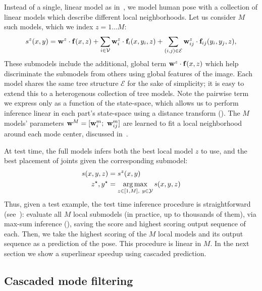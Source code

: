 Instead of a single, linear model as in~, we model human pose 
with a collection of linear models which describe different local 
neighborhoods.  Let us consider $M$ such models, which we index $z = 1 \ldots 
M$:
\begin{align}
s^z(x,y) = \mathbf{w}^z \cdot \mathbf{f}(x,z) +  \sum_{i \in \mathcal{V}} \mathbf{w}^z_i \cdot \mathbf{f}_i(x,y_i,z) + 
\sum_{(i,j) \in \mathcal{E}} \mathbf{w}^z_{ij} \cdot \mathbf{f}_{ij}(y_i,y_j,z),
\end{align}
These submodels include the additional, global term $\mathbf{w}^z \cdot \mathbf{f}(x,z)$ which 
help discriminate the submodels from others using global features of the image.  
Each model shares the same tree structure $\mathcal{E}$ for the sake of 
simplicity; it is easy to extend this to a heterogenous collection of tree 
models.  Note the pairwise term we express only as a function of the 
state-space, which allows us to perform inference linear in each part's 
state-space using a distance transform ().  The $M$ models' 
parameters $\mathbf{w}^M = [\mathbf{w}^m_i;~\mathbf{w}^m_{ij}]$ are learned to fit a local neighborhood 
around each mode center, discussed in~.

At test time, the full \LLPS models infers both the best local model $z$ to 
use, and the best placement of joints given the corresponding submodel:
\begin{align}
s(x,y,z) &= s^z(x,y) \\
z^\star,y^\star &= \mathop{\arg\max}_{z \in [1,M],~y \in \mathcal{Y}} s(x,y,z) 
\end{align}
Thus, given a test example, the test time inference procedure is 
straightforward (see~): evaluate all $M$ local submodels 
(in practice, up to thousands of them), via max-sum inference 
(), saving the score and highest scoring output sequence of 
each.  Then, we take the highest scoring of the $M$ local models and its output 
sequence as a prediction of the pose.  This procedure is linear in $M$.  In the 
next section we show a superlinear speedup using cascaded prediction.

\subsection{Cascaded mode filtering}

